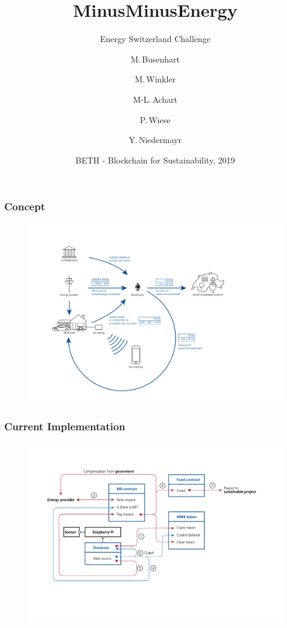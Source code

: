 \documentclass[t]{beamer}
\title{MinusMinusEnergy}
\subtitle{Energy Switzerland Challenge}
\author
{M.\,Busenhart \and M.\,Winkler \and M-L.\,Achart \\\and P.\,Wiese \and Y.\,Niedermayr}
\date[BETH 2019]
{BETH - Blockchain for Sustainability, 2019}
\begin{document}
  \frame{
    \titlepage
  }
  \begin{frame}
    \frametitle{Concept}
    \begin{figure}
    	\includegraphics[width=1\linewidth]{concept.png}
    \end{figure}
  \end{frame}

  \begin{frame}
		\frametitle{Current Implementation}
		\begin{figure}
			\includegraphics[width=1.1\linewidth]{implementation.png}
		\end{figure}
  \end{frame}
\end{document}
